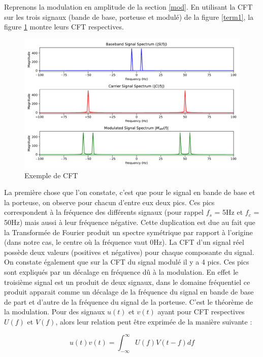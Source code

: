 \vspace{0.1cm}

Reprenons la modulation en amplitude de la section \ref{mod}. En utilisant la \ac{CFT} sur les trois signaux (bande de base, porteuse et modulé) de la figure \ref{term1}, la figure \ref{term8} montre leurs CFT respectives.

\begin{figure}[h]
\centering

\includegraphics[scale=0.5]{images/CFT.pdf}
\caption{Exemple de CFT}\label{term8}
\end{figure}

La première chose que l'on constate, c'est que pour le signal en bande de base et la porteuse, on observe pour chacun d'entre eux deux pics. Ces pics correspondent à la fréquence des différents signaux (pour rappel $f_s$ = 5Hz et $f_c$ = 50Hz) mais aussi à leur fréquence négative. Cette duplication est due au fait que la Transformée de Fourier produit un spectre symétrique par rapport à l'origine (dans notre cas, le centre où la fréquence vaut 0Hz). La CFT d'un signal réel possède deux valeurs (positives et négatives) pour chaque composante du signal. On constate également que sur la CFT du signal modulé il y a 4 pics. Ces pics sont expliqués par un décalage en fréquence dû à la modulation. En effet le troisième signal est un produit de deux signaux, dans le domaine fréquentiel ce produit apparait comme un décalage de la fréquence du signal en bande de base de part et d'autre de la fréquence du signal de la porteuse. C'est le théorème de la modulation. Pour des signaux $u(t)$ et $v(t)$ ayant pour CFT respectives $U(f)$ et $V(f)$, alors leur relation peut être exprimée de la manière suivante :

\begin{equation}
u(t)v(t) = \int_{-\infty}^{\infty} U(f)V(t - f) df
\end{equation}

